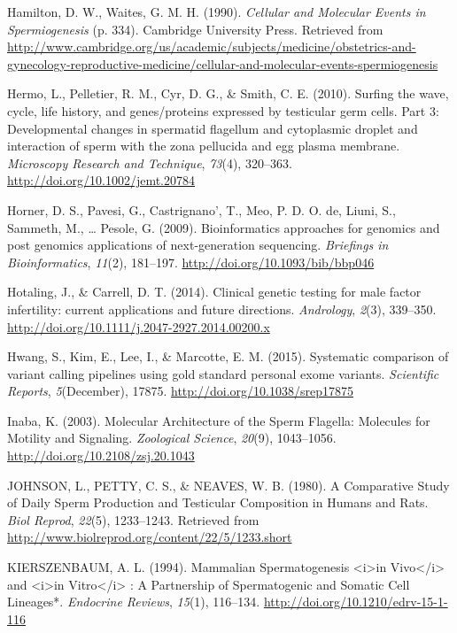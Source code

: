 \documentclass[12pt,twoside]{reedthesis}
\theoremstyle{definition}
\theoremstyle{definition}
\theoremstyle{remark}
\begin{document}
  \hypertarget{ref-Hamilton1987}{}
  Hamilton, D. W., Waites, G. M. H. (1990). \emph{Cellular and Molecular
  Events in Spermiogenesis} (p. 334). Cambridge University Press.
  Retrieved from
  \url{http://www.cambridge.org/us/academic/subjects/medicine/obstetrics-and-gynecology-reproductive-medicine/cellular-and-molecular-events-spermiogenesis}
  
  \hypertarget{ref-Hermo2010}{}
  Hermo, L., Pelletier, R. M., Cyr, D. G., \& Smith, C. E. (2010). Surfing
  the wave, cycle, life history, and genes/proteins expressed by
  testicular germ cells. Part 3: Developmental changes in spermatid
  flagellum and cytoplasmic droplet and interaction of sperm with the zona
  pellucida and egg plasma membrane. \emph{Microscopy Research and
  Technique}, \emph{73}(4), 320--363.
  \url{http://doi.org/10.1002/jemt.20784}
  
  \hypertarget{ref-Horner2009}{}
  Horner, D. S., Pavesi, G., Castrignano', T., Meo, P. D. O. de, Liuni,
  S., Sammeth, M., \ldots{} Pesole, G. (2009). Bioinformatics approaches
  for genomics and post genomics applications of next-generation
  sequencing. \emph{Briefings in Bioinformatics}, \emph{11}(2), 181--197.
  \url{http://doi.org/10.1093/bib/bbp046}
  
  \hypertarget{ref-Hotaling2014}{}
  Hotaling, J., \& Carrell, D. T. (2014). Clinical genetic testing for
  male factor infertility: current applications and future directions.
  \emph{Andrology}, \emph{2}(3), 339--350.
  \url{http://doi.org/10.1111/j.2047-2927.2014.00200.x}
  
  \hypertarget{ref-Hwang2015}{}
  Hwang, S., Kim, E., Lee, I., \& Marcotte, E. M. (2015). Systematic
  comparison of variant calling pipelines using gold standard personal
  exome variants. \emph{Scientific Reports}, \emph{5}(December), 17875.
  \url{http://doi.org/10.1038/srep17875}
  
  \hypertarget{ref-Inaba2003}{}
  Inaba, K. (2003). Molecular Architecture of the Sperm Flagella:
  Molecules for Motility and Signaling. \emph{Zoological Science},
  \emph{20}(9), 1043--1056. \url{http://doi.org/10.2108/zsj.20.1043}
  
  \hypertarget{ref-Johnson1980}{}
  JOHNSON, L., PETTY, C. S., \& NEAVES, W. B. (1980). A Comparative Study
  of Daily Sperm Production and Testicular Composition in Humans and Rats.
  \emph{Biol Reprod}, \emph{22}(5), 1233--1243. Retrieved from
  \url{http://www.biolreprod.org/content/22/5/1233.short}
  
  \hypertarget{ref-KIERSZENBAUM1994}{}
  KIERSZENBAUM, A. L. (1994). Mammalian Spermatogenesis
  \textless{}i\textgreater{}in Vivo\textless{}/i\textgreater{} and
  \textless{}i\textgreater{}in Vitro\textless{}/i\textgreater{} : A
  Partnership of Spermatogenic and Somatic Cell Lineages*. \emph{Endocrine
  Reviews}, \emph{15}(1), 116--134.
  \url{http://doi.org/10.1210/edrv-15-1-116}
  
\end{document}
